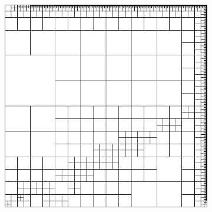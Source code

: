 \documentclass[mathserif]{beamer}
\begin{document}
\begin{frame}
{\begin{figure}
\begin{subfigure}[t]{0.49\textwidth}
\includegraphics[width=1.0\textwidth]{../figs/Confusion/robust8c_mesh.png}
\end{subfigure}
\end{figure}
}
\end{frame}

\end{document}
